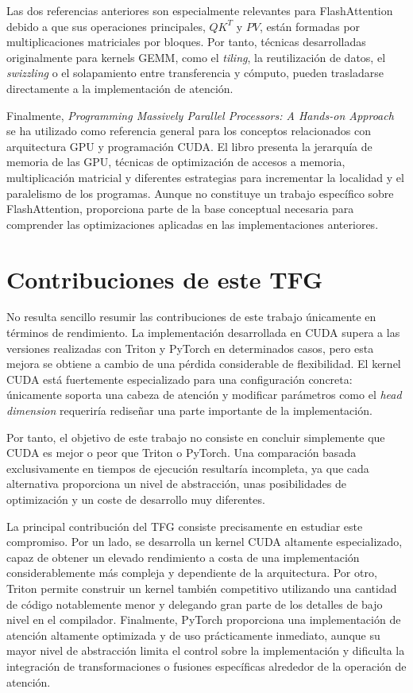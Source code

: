 Las dos referencias anteriores son especialmente relevantes para FlashAttention debido a que sus operaciones principales, \(QK^T\) y \(PV\), están formadas por multiplicaciones matriciales por bloques. Por tanto, técnicas desarrolladas originalmente para kernels GEMM, como el \textit{tiling}, la reutilización de datos, el \textit{swizzling} o el solapamiento entre transferencia y cómputo, pueden trasladarse directamente a la implementación de atención.

Finalmente, \textit{Programming Massively Parallel Processors: A Hands-on Approach} \cite{kirkHwuPMPP} se ha utilizado como referencia general para los conceptos relacionados con arquitectura GPU y programación CUDA. El libro presenta la jerarquía de memoria de las GPU, técnicas de optimización de accesos a memoria, multiplicación matricial y diferentes estrategias para incrementar la localidad y el paralelismo de los programas. Aunque no constituye un trabajo específico sobre FlashAttention, proporciona parte de la base conceptual necesaria para comprender las optimizaciones aplicadas en las implementaciones anteriores.

\section{Contribuciones de este TFG}

No resulta sencillo resumir las contribuciones de este trabajo únicamente en términos de rendimiento. La implementación desarrollada en CUDA supera a las versiones realizadas con Triton y PyTorch en determinados casos, pero esta mejora se obtiene a cambio de una pérdida considerable de flexibilidad. El kernel CUDA está fuertemente especializado para una configuración concreta: únicamente soporta una cabeza de atención y modificar parámetros como el \textit{head dimension} requeriría rediseñar una parte importante de la implementación.

Por tanto, el objetivo de este trabajo no consiste en concluir simplemente que CUDA es mejor o peor que Triton o PyTorch. Una comparación basada exclusivamente en tiempos de ejecución resultaría incompleta, ya que cada alternativa proporciona un nivel de abstracción, unas posibilidades de optimización y un coste de desarrollo muy diferentes.

La principal contribución del TFG consiste precisamente en estudiar este compromiso. Por un lado, se desarrolla un kernel CUDA altamente especializado, capaz de obtener un elevado rendimiento a costa de una implementación considerablemente más compleja y dependiente de la arquitectura. Por otro, Triton permite construir un kernel también competitivo utilizando una cantidad de código notablemente menor y delegando gran parte de los detalles de bajo nivel en el compilador. Finalmente, PyTorch proporciona una implementación de atención altamente optimizada y de uso prácticamente inmediato, aunque su mayor nivel de abstracción limita el control sobre la implementación y dificulta la integración de transformaciones o fusiones específicas alrededor de la operación de atención.

